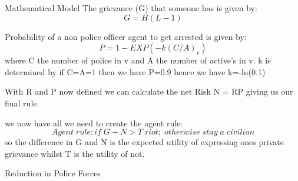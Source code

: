 \documentclass[final,hyperref={pdfpagelabels=false}]{beamer}
\begin{document}
\begin{frame}[t]
\begin{columns}[t]
\begin{column}{.32\textwidth}
\begin{block}{Mathematical Model}
						The grievance (G) that someone has is given by: 
						\begin{equation}
							G = H(L-1)
						\end{equation}
						
						
						Probability of a non police officer agent to get arrested is given by:
						\begin{equation}
							P = 1 - EXP(-k(C/A)_{v})
						\end{equation}
						 where C the number of police in v and A the number of active's in v. k is determined by if C=A=1 then we have P=0.9 hence we have k=-ln(0.1)
						
						With R and P now defined we can calculate the net Risk N = RP giving us our final rule
					
						we now  have all we need to create the agent rule:\\
						\begin{equation}
							Agent \; rule: if \; G-N>T \; riot; \; otherwise \; stay \; a \;  civilian
						\end{equation}
						so the difference in G and N is the expected utility of expressing ones private grievance whilst T is the utility of not.
						
						
					\end{block}
				\begin{block}{Reduction in Police Forces}
					

\end{block}
\end{column}
\end{columns}
\end{frame}
\end{document}
